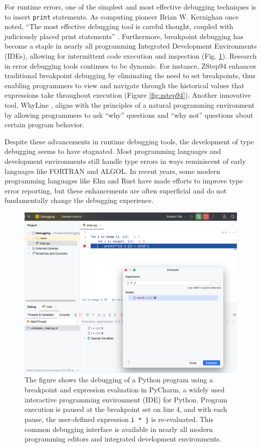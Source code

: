 For runtime errors, one of the simplest and most effective debugging techniques is to insert \texttt{print} statements. As computing pioneer Brian W. Kernighan once noted, ``The most effective debugging tool is careful thought, coupled with judiciously placed print statements'' \cite{Kernighan1978-xs}. Furthermore, breakpoint debugging has become a staple in nearly all programming Integrated Development Environments (IDEs), allowing for intermittent code execution and inspection (Fig. \ref{fig:breakpoint}). Research in error debugging tools continues to be dynamic. For instance, ZStep94 \cite{Lieberman1995-lg} enhances traditional breakpoint debugging by eliminating the need to set breakpoints, thus enabling programmers to view and navigate through the historical values that expressions take throughout execution (Figure \ref{fig:zstep94}). Another innovative tool, WhyLine \cite{Ko2009-uf}, aligns with the principles of a natural programming environment \cite{Myers2004-fy} by allowing programmers to ask ``why'' questions and ``why not'' questions about certain program behavior.

Despite these advancements in runtime debugging tools, the development of type debugging seems to have stagnated. Most programming languages and development environments still handle type errors in ways reminiscent of early languages like FORTRAN and ALGOL. In recent years, some modern programming languages like Elm and Rust have made efforts to improve type error reporting, but these enhancements are often superficial and do not fundamentally change the debugging experience.


\begin{figure}[]
  \includegraphics[width=\linewidth]{BreakPoint}
  \caption[Debugging of a Python program using a breakpoint and expression evaluation in PyCharm]{
    \label{fig:breakpoint}
    The figure shows the debugging of a Python program using a breakpoint and expression evaluation in PyCharm, a widely used interactive programming environment (IDE) for Python. Program execution is paused at the breakpoint set on line 4, and with each pause, the user-defined expression \texttt{i * j} is re-evaluated. This common debugging interface is available in nearly all modern programming editors and integrated development environments.
    }
\end{figure}


